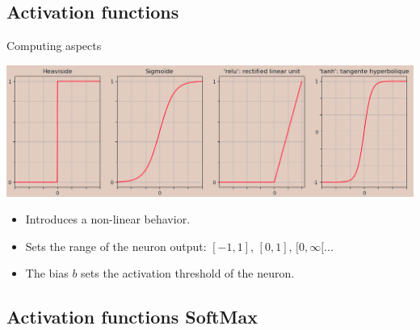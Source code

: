\documentclass[10pt,serif,mathserif,compress,hyperref={colorlinks}]{beamer}
\begin{document}
\subsection{Activation functions}

\begin{frame}{Computing aspects}
  
  \begin{tcolorbox}[add to width=.7cm, title={Common activation functions}]
    \includegraphics[width=1.\textwidth]{images/activ_functions-2.png}
  \end{tcolorbox}
  
  \begin{itemize}
  \item Introduces a non-linear behavior.
  \item Sets the range of the neuron output: $[-1, 1]$, $[0, 1]$, $[0, \infty[$...
    \item The bias $b$ sets the activation threshold of the neuron.
  \end{itemize}
  
\end{frame}

\subsection{Activation functions SoftMax}
\end{document}
